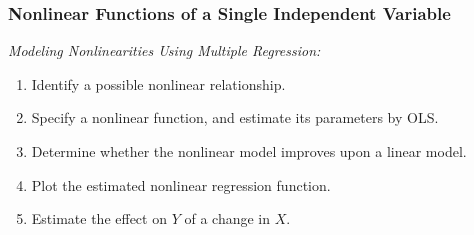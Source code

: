 

\begin{frame}
\frametitle{Nonlinear Functions of a Single Independent Variable}
\emph{Modeling Nonlinearities Using Multiple Regression:}
\begin{enumerate}
\item Identify a possible nonlinear relationship.
\item Specify a nonlinear function, and estimate its parameters by OLS.
\item Determine whether the nonlinear model improves upon a linear model. 
\item Plot the estimated nonlinear regression function. 
\item Estimate the effect on $Y$ of a change in $X$.
\end{enumerate}
\end{frame}

